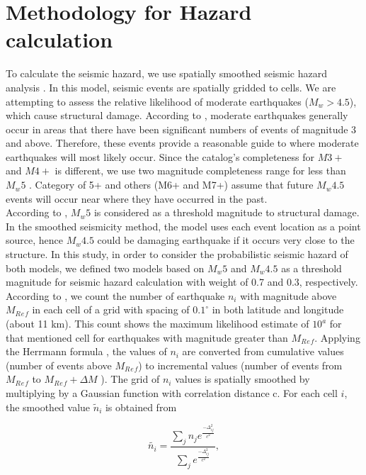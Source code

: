 \section{Methodology for Hazard calculation}

To calculate the seismic hazard, we use spatially smoothed seismic hazard analysis \citep{Frankel1995}. In this model, seismic events are spatially gridded to cells. We are attempting to assess the relative likelihood of moderate earthquakes ($M_w > 4.5$), which cause structural damage. According to \citet{Frankel1995}, moderate earthquakes generally occur in areas that there have been significant numbers of events of magnitude 3 and above. Therefore, these events provide a reasonable guide to where moderate earthquakes will most likely occur. Since the catalog's completeness for $M3+$ and $M4+$ is different, we use two magnitude completeness range for less than $M_w5$ . Category of 5+ and others (M6+ and M7+) assume that future $M_w4.5$ events will occur near where they have occurred in the past. \\
\noindent
According to \citep{BHRC2014}, $M_w5$ is considered as a threshold magnitude to structural damage. In the smoothed seismicity method, the model uses each event location as a point source, hence $M_w4.5$ could be damaging earthquake if it occurs very close to the structure. In this study, in order to consider the probabilistic seismic hazard of both models, we defined two models based on $M_w5$ and $M_w4.5$ as a threshold magnitude for seismic hazard calculation with weight of 0.7 and 0.3, respectively.\\
\noindent
According to \citet{Frankel1995}, we count the number of earthquake $n_i$ with magnitude above $M{_R{_e{_f}}}$ in each cell of a grid with spacing of $0.1^{\circ}$ in both latitude and longitude (about 11 km). This count shows the maximum likelihood estimate of $10^a$ for that mentioned cell \citep{Weichert1980, Bender1983} for earthquakes with magnitude greater than $M{_R{_e{_f}}}$. Applying the Herrmann formula \citep{Herrmann1977}, the values of $n_i$ are converted from cumulative values (number of events above $M{_R{_e{_f}}}$) to incremental values (number of events from $M{_R{_e{_f}}}$ to $M{_R{_e{_f}}} +\Delta M$ ). The grid of $n_i$ values is spatially smoothed by multiplying by a Gaussian function with correlation distance c. For each cell $i$, the smoothed value $\tilde{n}_i$ is obtained from \citet{Frankel1995}


\begin{equation}
\tilde{n_i}=\frac{\sum_{j} n_{j} e^{\frac{-\Delta_{ij}^{2}}{c^2}}}{\sum_{j} e^{\frac{-\Delta_{ij}^{2}}{c^2}}},
\end{equation}

